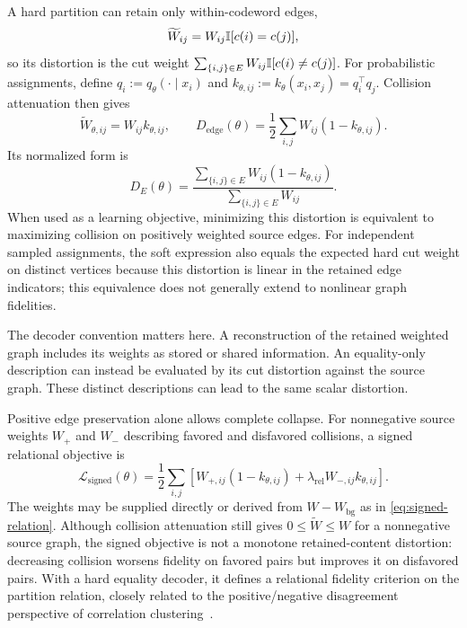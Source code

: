A hard partition can retain only within-codeword edges,
\begin{equation}
\widetilde W_{ij}=W_{ij}\mathbb{I}[c(i)=c(j)],
\label{eq:partition-retained-relation}
\end{equation}
so its distortion is the cut weight $\sum_{\{i,j\}\in E}W_{ij}\mathbb{I}[c(i)\ne c(j)]$.
For probabilistic assignments, define $q_i:=q_\theta(\cdot\mid x_i)$ and $k_{\theta,ij}:=k_\theta(x_i,x_j)=q_i^\top q_j$.
Collision attenuation then gives
\begin{equation}
\widetilde W_{\theta,ij}=W_{ij}k_{\theta,ij},\qquad
D_{\mathrm{edge}}(\theta)=\frac12\sum_{i,j}W_{ij}(1-k_{\theta,ij}).
\label{eq:soft-cut-distortion}
\end{equation}
Its normalized form is
\[
D_E(\theta)
=\frac{
\sum_{\{i,j\}\in E}W_{ij}(1-k_{\theta,ij})
}{
\sum_{\{i,j\}\in E}W_{ij}
}.
\]
When used as a learning objective, minimizing this distortion is equivalent to maximizing collision on positively weighted source edges.
For independent sampled assignments, the soft expression also equals the expected hard cut weight on distinct vertices because this distortion is linear in the retained edge indicators; this equivalence does not generally extend to nonlinear graph fidelities.

The decoder convention matters here.
A reconstruction of the retained weighted graph includes its weights as stored or shared information.
An equality-only description can instead be evaluated by its cut distortion against the source graph.
These distinct descriptions can lead to the same scalar distortion.

Positive edge preservation alone allows complete collapse.
For nonnegative source weights $W_+$ and $W_-$ describing favored and disfavored collisions, a signed relational objective is
\begin{equation}
\mathcal L_{\mathrm{signed}}(\theta)
=\frac12\sum_{i,j}\left[W_{+,ij}(1-k_{\theta,ij})
+\lambda_{\mathrm{rel}}W_{-,ij}k_{\theta,ij}\right].
\label{eq:signed-relational-objective}
\end{equation}
The weights may be supplied directly or derived from $W-W_{\mathrm{bg}}$ as in \cref{eq:signed-relation}.
Although collision attenuation still gives $0\le\widetilde W\le W$ for a nonnegative source graph, the signed objective is not a monotone retained-content distortion: decreasing collision worsens fidelity on favored pairs but improves it on disfavored pairs.
With a hard equality decoder, it defines a relational fidelity criterion on the partition relation, closely related to the positive/negative disagreement perspective of correlation clustering~\citep{bansal2004correlation}.

